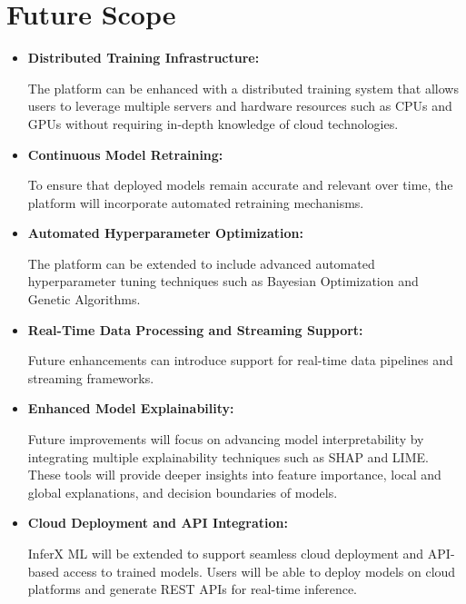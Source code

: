 \chapter{Future Scope}

\begin{itemize}

\item \textbf{Distributed Training Infrastructure:}

The platform can be enhanced with a distributed training system that allows users to leverage multiple servers and hardware resources such as CPUs and GPUs without requiring in-depth knowledge of cloud technologies. \\

\item \textbf{Continuous Model Retraining:}

To ensure that deployed models remain accurate and relevant over time, the platform will incorporate automated retraining mechanisms. \\
\item \textbf{Automated Hyperparameter Optimization:}

The platform can be extended to include advanced automated hyperparameter tuning techniques such as Bayesian Optimization and Genetic Algorithms. \\
\item \textbf{Real-Time Data Processing and Streaming Support:}

Future enhancements can introduce support for real-time data pipelines and streaming frameworks. \\

\item \textbf{Enhanced Model Explainability:}

Future improvements will focus on advancing model interpretability by integrating multiple explainability techniques such as SHAP and LIME. These tools will provide deeper insights into feature importance, local and global explanations, and decision boundaries of models. \\

\item \textbf{Cloud Deployment and API Integration:}

InferX ML will be extended to support seamless cloud deployment and API-based access to trained models. Users will be able to deploy models on cloud platforms and generate REST APIs for real-time inference. \\

\end{itemize}